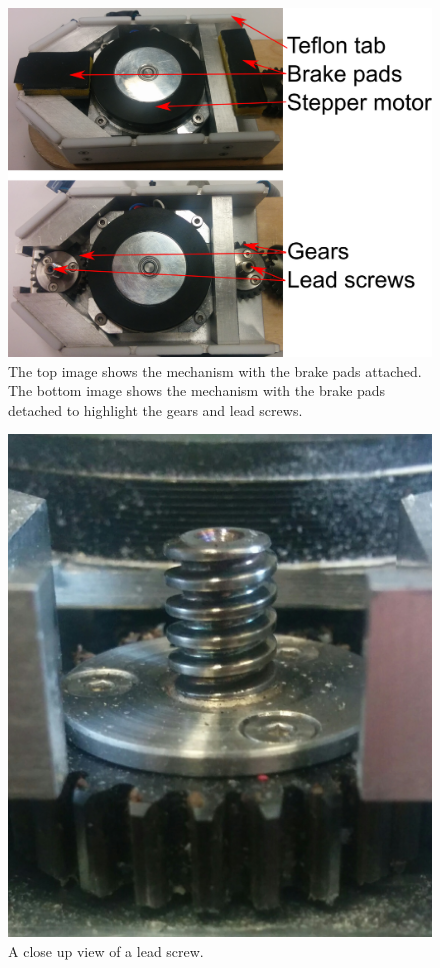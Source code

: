 \documentclass [12pt,letterpaper]{report}
\begin{document}

\begin{figure}%
  \centering
  \includegraphics[scale=0.1]{fig/mechanism_fiducial}
  \caption{The top image shows the mechanism with the brake pads attached. The bottom image shows the mechanism with the brake pads detached to highlight the gears and lead screws.}
  \label{mechanism_fiducial}
\end{figure}


\begin{figure}%
  \centering
  \includegraphics[scale=0.12]{fig/leadscrew_closeup}
  \caption{A close up view of a lead screw.}
  \label{leadscrew_closeup}
\end{figure}
\end{document}
